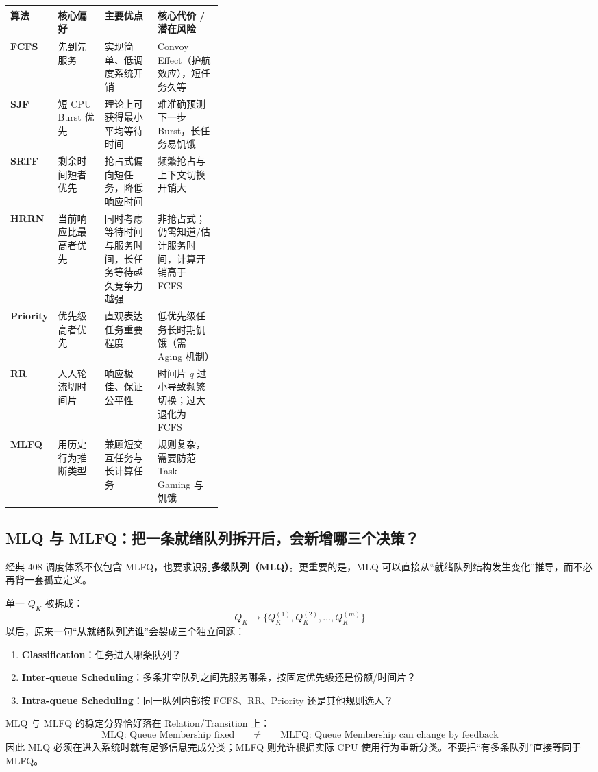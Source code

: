 \documentclass[11pt,a4paper]{ctexart}
\newcommand{\kw}[1]{\textbf{#1}}
\begin{document}
\begingroup
\small
\renewcommand{\arraystretch}{1.25}
\setlength{\tabcolsep}{5pt}
\begin{tabularx}{\linewidth}{>{\bfseries}p{0.14\linewidth} p{0.22\linewidth} X X}
\toprule
算法 & 核心偏好 & 主要优点 & 核心代价 / 潜在风险\\
\midrule
FCFS & 先到先服务 & 实现简单、低调度系统开销 & Convoy Effect（护航效应），短任务久等\\
SJF & 短 CPU Burst 优先 & 理论上可获得最小平均等待时间 & 难准确预测下一步 Burst，长任务易饥饿\\
SRTF & 剩余时间短者优先 & 抢占式偏向短任务，降低响应时间 & 频繁抢占与上下文切换开销大\\
HRRN & 当前响应比最高者优先 & 同时考虑等待时间与服务时间，长任务等待越久竞争力越强 & 非抢占式；仍需知道/估计服务时间，计算开销高于 FCFS\\
Priority & 优先级高者优先 & 直观表达任务重要程度 & 低优先级任务长时期饥饿（需 Aging 机制）\\
RR & 人人轮流切时间片 & 响应极佳、保证公平性 & 时间片 $q$ 过小导致频繁切换；过大退化为 FCFS\\
MLFQ & 用历史行为推断类型 & 兼顾短交互任务与长计算任务 & 规则复杂，需要防范 Task Gaming 与饥饿\\
\bottomrule
\end{tabularx}
\endgroup

\subsection{MLQ 与 MLFQ：把一条就绪队列拆开后，会新增哪三个决策？}

经典 408 调度体系不仅包含 MLFQ，也要求识别\kw{多级队列（MLQ）}。更重要的是，MLQ 可以直接从“就绪队列结构发生变化”推导，而不必再背一套孤立定义。

单一 $Q_K$ 被拆成：
\[
Q_K\longrightarrow\{Q_K^{(1)},Q_K^{(2)},\ldots,Q_K^{(m)}\}
\]
以后，原来一句“从就绪队列选谁”会裂成三个独立问题：
\begin{enumerate}
\item \kw{Classification}：任务进入哪条队列？
\item \kw{Inter-queue Scheduling}：多条非空队列之间先服务哪条，按固定优先级还是份额/时间片？
\item \kw{Intra-queue Scheduling}：同一队列内部按 FCFS、RR、Priority 还是其他规则选人？
\end{enumerate}

MLQ 与 MLFQ 的稳定分界恰好落在 Relation/Transition 上：
\[
\boxed{
\text{MLQ: Queue Membership fixed}
\qquad\neq\qquad
\text{MLFQ: Queue Membership can change by feedback}
}
\]
因此 MLQ 必须在进入系统时就有足够信息完成分类；MLFQ 则允许根据实际 CPU 使用行为重新分类。不要把“有多条队列”直接等同于 MLFQ。
\end{document}
